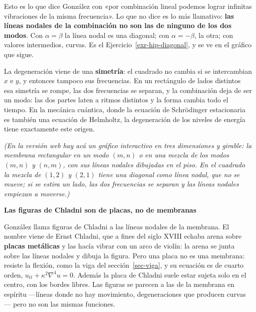 \documentclass[
  spanish,
  a4paper,
]{scrbook}
\theoremstyle{definition}
\theoremstyle{plain}
\theoremstyle{definition}
\theoremstyle{plain}
\theoremstyle{definition}
\theoremstyle{remark}
\begin{document}
Esto es lo que dice González con «por combinación lineal podemos lograr
infinitas vibraciones de la misma frecuencia». Lo que no dice es lo más
llamativo: \textbf{las líneas nodales de la combinación no son las de
ninguno de los dos modos}. Con \(\alpha = \beta\) la línea nodal es una
diagonal; con \(\alpha = -\beta\), la otra; con valores intermedios,
curvas. Es el Ejercicio~\ref{exr-hip-diagonal}, y se ve en el gráfico
que sigue.

La degeneración viene de una \textbf{simetría}: el cuadrado no cambia si
se intercambian \(x\) e \(y\), y entonces tampoco sus frecuencias. En un
rectángulo de lados distintos esa simetría se rompe, las dos frecuencias
se separan, y la combinación deja de ser un modo: las dos partes laten a
ritmos distintos y la forma cambia todo el tiempo. En la mecánica
cuántica, donde la ecuación de Schrödinger estacionaria es también una
ecuación de Helmholtz, la degeneración de los niveles de energía tiene
exactamente este origen.

\emph{(En la versión web hay acá un gráfico interactivo en tres
dimensiones y girable: la membrana rectangular en un modo \((m,n)\) o en
una mezcla de los modos \((m,n)\) y \((n,m)\), con sus líneas nodales
dibujadas en el piso. En el cuadrado la mezcla de \((1,2)\) y \((2,1)\)
tiene una diagonal como línea nodal, que no se mueve; si se estira un
lado, las dos frecuencias se separan y las líneas nodales empiezan a
moverse.)}

\begin{tcolorbox}[enhanced jigsaw, arc=.35mm, bottomrule=.15mm, breakable, colback=white, colframe=quarto-callout-note-color-frame, left=2mm, leftrule=.75mm, opacityback=0, rightrule=.15mm, toprule=.15mm]
\begin{minipage}[t]{5.5mm}
\textcolor{quarto-callout-note-color}{\faInfo}
\end{minipage}%
\begin{minipage}[t]{\textwidth - 5.5mm}

\vspace{-3mm}\textbf{Las figuras de Chladni son de placas, no de membranas}\vspace{3mm}

González llama figuras de Chladni a las líneas nodales de la membrana.
El nombre viene de Ernst Chladni, que a fines del siglo XVIII echaba
arena sobre \textbf{placas metálicas} y las hacía vibrar con un arco de
violín: la arena se junta sobre las líneas nodales y dibuja la figura.
Pero una placa no es una membrana: resiste la flexión, como la viga del
sección~\ref{sec-viga}, y su ecuación es de cuarto orden,
\(u_{tt} + \kappa^2\nabla^4u = 0\). Además la placa de Chladni suele
estar sujeta solo en el centro, con los bordes libres. Las figuras se
parecen a las de la membrana en espíritu ---líneas donde no hay
movimiento, degeneraciones que producen curvas--- pero no son las mismas
funciones.

\end{minipage}%
\end{tcolorbox}
\end{document}
